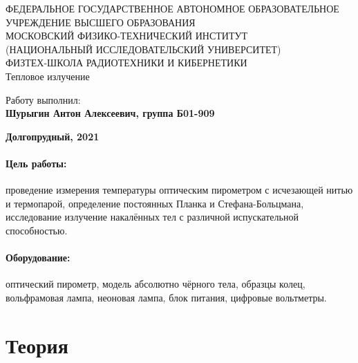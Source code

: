 \documentclass[15pt,a5paper,reqno]{article}
\begin{document}
\begin{center}
  {\small ФЕДЕРАЛЬНОЕ ГОСУДАРСТВЕННОЕ АВТОНОМНОЕ ОБРАЗОВАТЕЛЬНОЕ\\ УЧРЕЖДЕНИЕ ВЫСШЕГО ОБРАЗОВАНИЯ\\ МОСКОВСКИЙ ФИЗИКО-ТЕХНИЧЕСКИЙ ИНСТИТУТ\\ (НАЦИОНАЛЬНЫЙ ИССЛЕДОВАТЕЛЬСКИЙ УНИВЕРСИТЕТ)\\ ФИЗТЕХ-ШКОЛА РАДИОТЕХНИКИ И КИБЕРНЕТИКИ}\\
  \hfill \break
  \hfill \break
  \hfill \break
  \Huge{Тепловое излучение}\\
\end{center}

\hfill \break
\hfill \break
\hfill \break
\hfill \break
\hfill \break
\hfill \break

\begin{flushright}
  \normalsize{Работу выполнил:}\\
  \normalsize{\textbf{Шурыгин Антон Алексеевич, группа Б01-909}}\\
\end{flushright}

\begin{center}
  \normalsize{\textbf{Долгопрудный, 2021}}
\end{center}


\thispagestyle{empty} %


\newpage
\thispagestyle{plain}
\tableofcontents
\thispagestyle{plain}
\newpage

\paragraph{Цель работы:} проведение измерения температуры оптическим пирометром с исчезающей нитью и термопарой, определение постоянных Планка и Стефана-Больцмана, исследование излучение накалённых тел с различной испускательной способностью.
\paragraph{Оборудование:} оптический пирометр, модель абсолютно чёрного тела, образцы колец, вольфрамовая лампа, неоновая лампа, блок питания, цифровые вольтметры.


\section{Теория}
\end{document}
